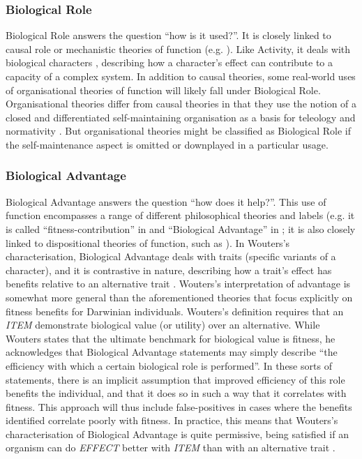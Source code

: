 \documentclass{article}
\begin{document}
\subsubsection{Biological Role}
\label{sec:biological-role}

Biological Role answers the question ``how is it used?''.
It is closely linked to causal role or mechanistic theories of function (e.g. \cite{cummins1975}).
Like Activity, it deals with biological characters \cite{wouters2003}, describing how a character's effect can contribute to a capacity of a complex system.
In addition to causal theories, some real-world uses of organisational theories of function will likely fall under Biological Role.
Organisational theories differ from causal theories in that they use the notion of a closed and differentiated self-maintaining organisation as a basis for teleology and normativity \cite{mossio2009}.
But organisational theories might be classified as Biological Role if the self-maintenance aspect is omitted or downplayed in a particular usage.

\subsubsection{Biological Advantage}
\label{sec:biological-advantage}

Biological Advantage answers the question ``how does it help?''.
This use of function encompasses a range of different philosophical theories and labels (e.g. it is called ``fitness-contribution'' in \cite{garson2016} and ``Biological Advantage'' in \cite{wouters2003}; it is also closely linked to dispositional theories of function, such as \cite{bigelow1987}).
In Wouters's characterisation, Biological Advantage deals with traits (specific variants of a character), and it is contrastive in nature, describing how a trait's effect has benefits relative to an alternative trait \cite{wouters2003}.
Wouters's interpretation of advantage is somewhat more general than the aforementioned theories that focus explicitly on fitness benefits for Darwinian individuals.
Wouters's definition requires that an \emph{ITEM} demonstrate biological value (or utility) over an alternative.
While Wouters states that the ultimate benchmark for biological value is fitness, he acknowledges that Biological Advantage statements may simply describe ``the efficiency with which a certain biological role is performed''.\cite[646]{wouters2003}
In these sorts of statements, there is an implicit assumption that improved efficiency of this role benefits the individual, and that it does so in such a way that it correlates with fitness.
This approach will thus include false-positives in cases where the benefits identified correlate poorly with fitness.
In practice, this means that Wouters's characterisation of Biological Advantage is quite permissive, being satisfied if an organism can do \emph{EFFECT} better with \emph{ITEM} than with an alternative trait \cite{bigelow1987}.
\end{document}
